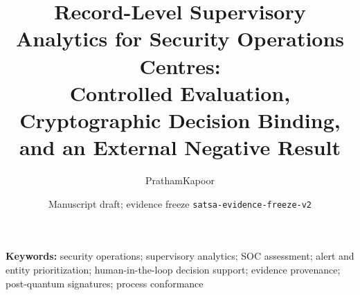 \documentclass[11pt]{article}
\title{Record-Level Supervisory Analytics for Security Operations Centres:\\
Controlled Evaluation, Cryptographic Decision Binding, and an External Negative Result}
\author{PrathamKapoor}
\date{Manuscript draft; evidence freeze \texttt{satsa-evidence-freeze-v2}}
\begin{document}
\maketitle

\begin{abstract}

\end{abstract}

\noindent\textbf{Keywords:} security operations; supervisory analytics; SOC assessment;
alert and entity prioritization; human-in-the-loop decision support; evidence provenance;
post-quantum signatures; process conformance
















\end{document}
